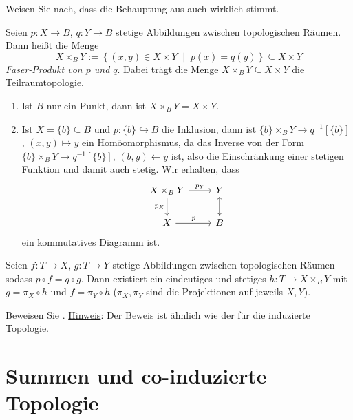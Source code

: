 \documentclass[
12pt, 
openany, 
a4paper, 
final,
fleqn, 
]{myclass}
\numberwithin{equation}{chapter}
\numberwithin{section}{chapter}
\newcommand{\embed}{\hookrightarrow}
\newcommand{\set}[2]{\left\{#1\;\middle|\;#2\right\}}
\newcommand{\hint}[1]{\newline\noindent\underline{Hinweis}: #1}
\begin{document}
\begin{ex}
Weisen Sie nach, dass die Behauptung aus  auch wirklich stimmt. 
\end{ex}

\begin{defn}\label{2.11}
Seien $p: X\to B$, $q: Y\to B$ stetige Abbildungen zwischen topologischen Räumen. Dann heißt die Menge 
\[
X\times_{B}Y := \set{(x, y)\in X\times Y}{p(x)=q(y)}\subseteq X\times Y
\]
\emph{Faser-Produkt von $p$ und $q$}. Dabei trägt die Menge $X\times_{B}Y \subseteq X\times Y$ die Teilraumtopologie. 
\end{defn}

\begin{rmk}\label{2.12}
\begin{enumerate}[label=(\textit{\roman*})]
\item Ist $B$ nur ein Punkt, dann ist $X\times_{B}Y = X\times Y$. 

\item Ist $X=\{b\}\subseteq B$ und $p: \{b\} \embed B$ die Inklusion, dann ist $ \{b\}\times_{B}Y\to q^{-1}[\{b\}]$, $ (x, y)\mapsto y $ ein Homöomorphismus, da das Inverse von der Form $\{b\}\times_{B}Y \rightarrow q^{-1}[\{b\}]$, $ (b, y)\mapsfrom y $ ist, also die Einschränkung einer stetigen Funktion und damit auch stetig. Wir erhalten, dass
\[ \begin{tikzcd}
X\times_B Y \arrow{r}{p_Y} \arrow[swap]{d}{p_X} & Y\arrow{d}{}  \\%
X \arrow{r}{p}& B \arrow{u}{}
\end{tikzcd}
\]
ein kommutatives Diagramm ist. 
\end{enumerate}
\end{rmk}

\begin{thr}\label{2.13}
Seien $f: T\to X$, $g: T\to Y$ stetige Abbildungen zwischen topologischen Räumen sodass $ p\circ f = q\circ g $. Dann existiert ein eindeutiges und stetiges $h: T\to X\times_{B}Y$ mit $g=\pi_{X}\circ h$ und $f= \pi_{Y}\circ h$ ($\pi_{X}, \pi_{Y}$ sind die Projektionen auf jeweils $X, Y$). 
\end{thr}

\begin{ex}
Beweisen Sie . \hint{Der Beweis ist ähnlich wie der für die induzierte Topologie.}
\end{ex}

\section{Summen und co-induzierte Topologie}
\end{document}
